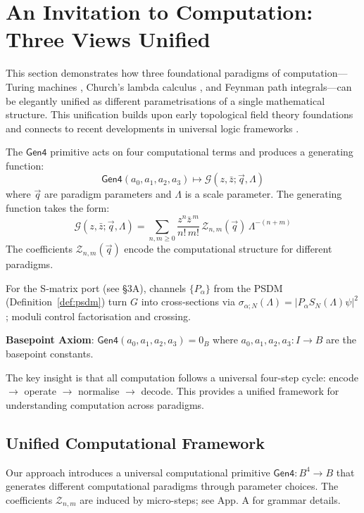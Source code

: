 \section{An Invitation to Computation: Three Views Unified}
\label{sec:computation-paradigms}

This section demonstrates how three foundational paradigms of computation—Turing machines \cite{turing1936}, Church's lambda calculus \cite{church1936,howard1980,curry1958}, and Feynman path integrals—can be elegantly unified as different parametrisations of a single mathematical structure. This unification builds upon early topological field theory foundations \cite{witten1988} and connects to recent developments in universal logic frameworks \cite{universal_logic_2023}.

\begin{definition}
\label{def:gen4-primitive}
The $\mathsf{Gen4}$ primitive acts on four computational terms and produces a generating function:
\[
\mathsf{Gen4}(a_0, a_1, a_2, a_3) \mapsto \mathcal{G}(z,\bar{z};\vec{q},\Lambda)
\]
where $\vec{q}$ are paradigm parameters and $\Lambda$ is a scale parameter. The generating function takes the form:
\[
\mathcal{G}(z,\bar{z};\vec{q},\Lambda) = \sum_{n,m\ge0}\frac{z^n\bar{z}^{\,m}}{n!\,m!}\,\mathcal{Z}_{n,m}(\vec{q})\,\Lambda^{-(n+m)}
\label{eq:generating-function-g6}
\]
The coefficients $\mathcal{Z}_{n,m}(\vec{q})$ encode the computational structure for different paradigms.

For the S‑matrix port (see §3A), channels $\{P_\alpha\}$ from the PSDM (Definition~\ref{def:psdm}) turn $G$ into cross‑sections via $\sigma_{\alpha;N}(\Lambda)=|P_\alpha S_N(\Lambda)\psi|^2$; moduli control factorisation and crossing.

\textbf{Basepoint Axiom}: $\mathsf{Gen4}(a_0, a_1, a_2, a_3) = 0_B$ where $a_0, a_1, a_2, a_3: I \to B$ are the basepoint constants.
\end{definition}

The key insight is that all computation follows a universal four-step cycle: encode $\to$ operate $\to$ normalise $\to$ decode. This provides a unified framework for understanding computation across paradigms.

\subsection{Unified Computational Framework}

Our approach introduces a universal computational primitive $\mathsf{Gen4}: B^4 \to B$ that generates different computational paradigms through parameter choices. The coefficients $\mathcal{Z}_{n,m}$ are induced by micro-steps; see App. A for grammar details.

